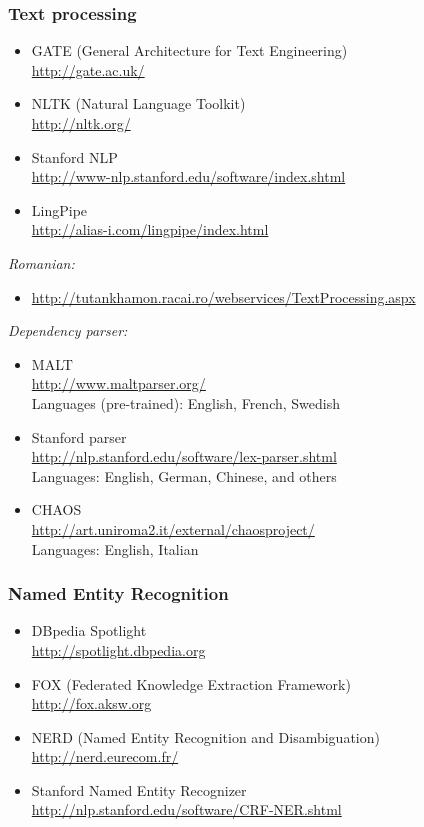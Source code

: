 \subsubsection*{Text processing}

\begin{itemize}
\item GATE (General Architecture for Text Engineering) \\
      \url{http://gate.ac.uk/}
\item NLTK (Natural Language Toolkit) \\
      \url{http://nltk.org/}
\item Stanford NLP \\
      \url{http://www-nlp.stanford.edu/software/index.shtml}
\item LingPipe \\
      \url{http://alias-i.com/lingpipe/index.html}      
\end{itemize}

\emph{Romanian:}
\begin{itemize}
\item 
\url{http://tutankhamon.racai.ro/webservices/TextProcessing.aspx}
\end{itemize}

\emph{Dependency parser:}

\begin{itemize}
\item MALT \\
      \url{http://www.maltparser.org/} \\
      Languages (pre-trained): English, French, Swedish 
\item Stanford parser \\ 
      \url{http://nlp.stanford.edu/software/lex-parser.shtml} \\ 
      Languages: English, German, Chinese, and others
\item CHAOS \\
      \url{http://art.uniroma2.it/external/chaosproject/} \\
      Languages: English, Italian
\end{itemize}      

\subsubsection*{Named Entity Recognition}

\begin{itemize}
\item DBpedia Spotlight \\ 
      \url{http://spotlight.dbpedia.org}
\item FOX (Federated Knowledge Extraction Framework) \\ 
      \url{http://fox.aksw.org}
\item NERD (Named Entity Recognition and Disambiguation) \\
      \url{http://nerd.eurecom.fr/}
\item Stanford Named Entity Recognizer \\
      \url{http://nlp.stanford.edu/software/CRF-NER.shtml}
\end{itemize}

